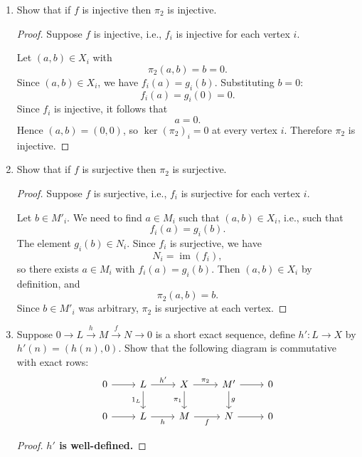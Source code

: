 \documentclass[11pt, a4paper]{article}
\begin{document}
\begin{enumerate}[leftmargin=*, label=\textbf{\arabic*.}]
\begin{enumerate}[label=(\alph*)]
\begin{proof}
    \medskip\noindent\textbf{Commutativity of the diagram.}
    
    For any $(a,b)\in X_i$, we have
    \[
    (f\circ\pi_1)_i(a,b) = f_i\bigl(\pi_1(a,b)\bigr) = f_i(a) = g_i(b) = g_i\bigl(\pi_2(a,b)\bigr) = (g\circ\pi_2)_i(a,b).
    \]
    Hence $f\circ\pi_1 = g\circ\pi_2$, and the diagram
    \[
    \begin{tikzcd}
        X \arrow[r, "\pi_2"] \arrow[d, "\pi_1"'] & M' \arrow[d, "g"] \\
        M \arrow[r, "f"'] & N
    \end{tikzcd}
    \]
    commutes.
    \end{proof}
    \item Show that if $f$ is injective then $\pi_2$ is injective.
    \begin{proof}
    Suppose $f$ is injective, i.e., $f_i$ is injective for each vertex $i$.
    
    Let $(a,b)\in X_i$ with
    \[
    \pi_2(a,b) = b = 0.
    \]
    Since $(a,b)\in X_i$, we have $f_i(a)=g_i(b)$. Substituting $b=0$:
    \[
    f_i(a) = g_i(0) = 0.
    \]
    Since $f_i$ is injective, it follows that
    \[
    a = 0.
    \]
    Hence $(a,b)=(0,0)$, so $\ker(\pi_2)_i = 0$ at every vertex $i$. Therefore $\pi_2$ is injective.
    \end{proof}
    \item Show that if $f$ is surjective then $\pi_2$ is surjective.
    \begin{proof}
    Suppose $f$ is surjective, i.e., $f_i$ is surjective for each vertex $i$.
    
    Let $b\in M'_i$. We need to find $a\in M_i$ such that $(a,b)\in X_i$, i.e., such that
    \[
    f_i(a) = g_i(b).
    \]
    The element $g_i(b)\in N_i$. Since $f_i$ is surjective, we have
    \[
    N_i = \operatorname{im}(f_i),
    \]
    so there exists $a\in M_i$ with $f_i(a) = g_i(b)$. Then $(a,b)\in X_i$ by definition, and
    \[
    \pi_2(a,b) = b.
    \]
    Since $b\in M'_i$ was arbitrary, $\pi_2$ is surjective at each vertex.
    \end{proof}
    \item Suppose $0 \to L \xrightarrow{h} M \xrightarrow{f} N \to 0$ is a short exact sequence, define $h' \colon L \to X$ by $h'(n) = (h(n), 0)$. Show that the following diagram is commutative with exact rows:
    \[
    \begin{tikzcd}
        0 \arrow[r] & L \arrow[r, "h'"] \arrow[d, "1_L"'] & X \arrow[r, "\pi_2"] \arrow[d, "\pi_1"'] & M' \arrow[r] \arrow[d, "g"] & 0 \\
        0 \arrow[r] & L \arrow[r, "h"'] & M \arrow[r, "f"'] & N \arrow[r] & 0
    \end{tikzcd}
    \]
    \begin{proof}
    \textbf{$h'$ is well-defined.}
    

\end{proof}
\end{enumerate}
\end{enumerate}
\end{document}
